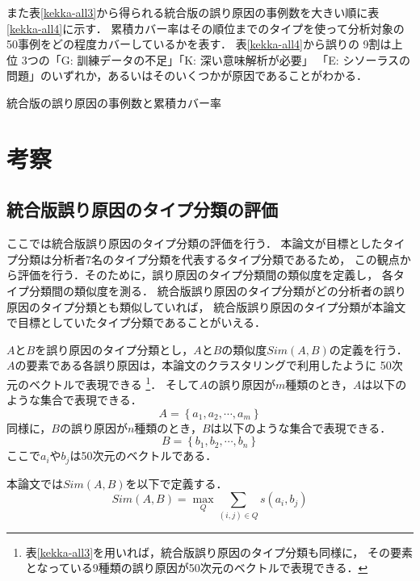 \documentclass[japanese]{jnlp_1.4}
\begin{document}
また\mbox{表\ref{kekka-all3}}から得られる統合版の誤り原因の事例数を大きい順に\mbox{表\ref{kekka-all4}}に示す．
累積カバー率はその順位までのタイプを使って分析対象の50事例をどの程度カバーしているかを表す．
\mbox{表\ref{kekka-all4}}から誤りの 9割は上位 3つの「G: 訓練データの不足」「K: 深い意味解析が必要」
「E: シソーラスの問題」のいずれか，あるいはそのいくつかが原因であることがわかる．

\begin{table}[t]
\caption{統合版の誤り原因の事例数と累積カバー率}
\label{kekka-all4}

\end{table}


\section{考察}

\subsection{統合版誤り原因のタイプ分類の評価}

ここでは統合版誤り原因のタイプ分類の評価を行う．
本論文が目標としたタイプ分類は分析者7名のタイプ分類を代表するタイプ分類であるため，
この観点から評価を行う．そのために，誤り原因のタイプ分類間の類似度を定義し，
各タイプ分類間の類似度を測る．
統合版誤り原因のタイプ分類がどの分析者の誤り原因のタイプ分類とも類似していれば，
統合版誤り原因のタイプ分類が本論文で目標としていたタイプ分類であることがいえる．

$A$と$B$を誤り原因のタイプ分類とし，$A$と$B$の類似度$Sim(A,B)$の定義を行う．
$A$の要素である各誤り原因は，本論文のクラスタリングで利用したように 50次元のベクトルで表現できる
\footnote{\mbox{表\ref{kekka-all3}}を用いれば，統合版誤り原因のタイプ分類も同様に，
その要素となっている9種類の誤り原因が50次元のベクトルで表現できる．}．
そして$A$の誤り原因が$m$種類のとき，$A$は以下のような集合で表現できる．
\begin{equation}
 A = \left\{ a_1, a_2, \cdots, a_m  \right\}    
\end{equation}
同様に，$B$の誤り原因が$n$種類のとき，$B$は以下のような集合で表現できる．
\begin{equation}
 B = \left\{ b_1, b_2, \cdots, b_n  \right\}    
\end{equation}
ここで$a_i$や$b_j$は50次元のベクトルである．

本論文では$Sim(A,B)$を以下で定義する．
\begin{equation}
 Sim(A,B) = \max_{Q} \sum_{(i,j) \in Q} s(a_i,b_j)     
\end{equation}
\end{document}
